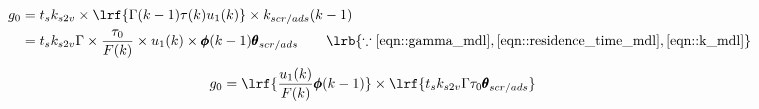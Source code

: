 \begin{align*}
        g_0 &= t_s k_{s2v} \times \lrf{\Gamma(k-1) \tau(k) u_1(k)} \times k_{scr/ads}(k-1)\\
                &= t_s k_{s2v} \Gamma \times \frac{\tau_0}{F(k)} \times u_1 (k) \times \pmb \phi(k-1) \pmb \theta_{scr/ads}
                \qquad \lrb{\because \ref{eqn::gamma_mdl}, \ref{eqn::residence_time_mdl}, \ref{eqn::k_mdl}}
\end{align*}
\begin{align}
        g_0 &= \lrf{ \frac{u_1(k)}{F(k)} \pmb \phi(k-1) } \times \lrf{ t_s k_{s2v} \Gamma \tau_0 \pmb \theta_{scr/ads} }
\end{align}

